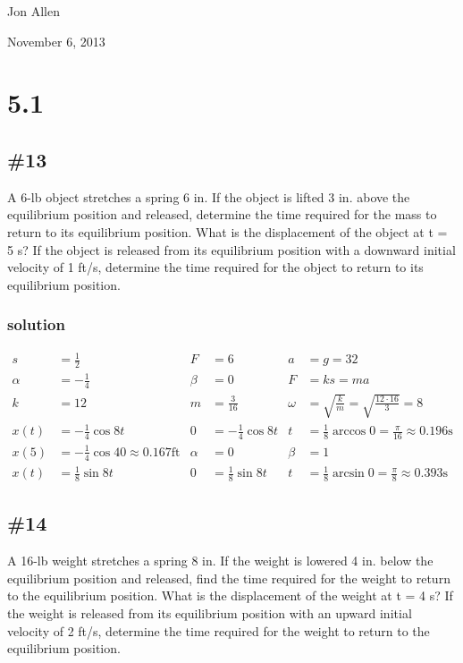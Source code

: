 \documentclass{article}
\begin{document}
Jon Allen

November 6, 2013

\section*{5.1}

\subsection*{\#13}
A 6-lb object stretches a spring 6 in. If the object is lifted 3 in. above the equilibrium
position and released, determine the time required for the mass to return to its equilibrium
position. What is the displacement of the object at t = 5 s? If the object is released from
its equilibrium position with a downward initial velocity of 1 ft/s, determine the time
required for the object to return to its equilibrium position.
\subsubsection*{solution}
\begin{align*}
	s&=\frac{1}{2} & F&=6 & a&=g=32\\
	\alpha&=-\frac{1}{4} & \beta&=0 &	F&=ks=ma\\
	k&=12 & m&=\frac{3}{16} & \omega&=\sqrt{\frac{k}{m}}=\sqrt{\frac{12\cdot16}{3}}=8\\
	x(t)&=-\frac{1}{4}\cos 8t & 0&=-\frac{1}{4}\cos 8t & t&=\frac{1}{8}\arccos 0=\frac{\pi}{16}\approx 0.196\text{s}\\
	x(5)&=-\frac{1}{4}\cos 40\approx 0.167\text{ft} & \alpha&=0 &	\beta&=1\\
	x(t)&=\frac{1}{8}\sin 8t & 0&=\frac{1}{8}\sin 8t &	t&=\frac{1}{8}\arcsin 0=\frac{\pi}{8}\approx0.393\text{s}
\end{align*}

\subsection*{\#14}
A 16-lb weight stretches a spring 8 in. If the weight is lowered 4 in. below the equilibrium
position and released, find the time required for the weight to return to the equilibrium
position. What is the displacement of the weight at t = 4 s? If the weight is released from
its equilibrium position with an upward initial velocity of 2 ft/s, determine the time required
for the weight to return to the equilibrium position.
\end{document}
